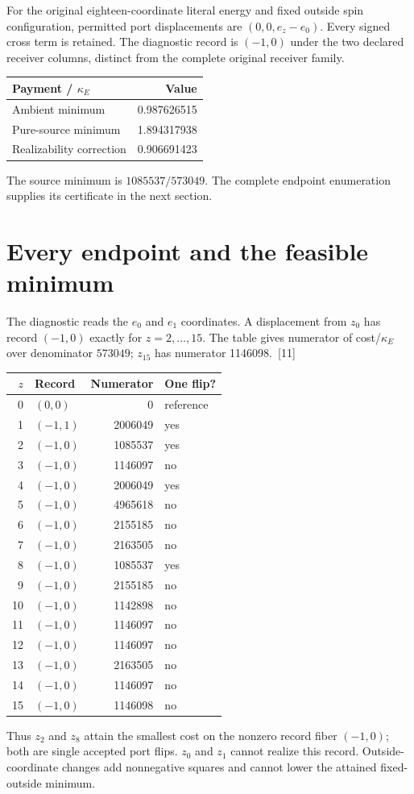\documentclass[10pt,twocolumn,letterpaper]{article}
\begin{document}
For the original eighteen-coordinate literal energy and fixed outside spin configuration, permitted port displacements are $(0,0,e_z-e_0)$. Every signed cross term is retained. The diagnostic record is $(-1,0)$ under the two declared receiver columns, distinct from the complete original receiver family.

\begin{center}
\begin{tabular}{@{}lr@{}}
\toprule
Payment / $\kappa_E$ & Value\\
\midrule
Ambient minimum & 0.987626515\\
Pure-source minimum & 1.894317938\\
Realizability correction & 0.906691423\\
\bottomrule
\end{tabular}
\end{center}
The source minimum is $1085537/573049$. The complete endpoint enumeration supplies its certificate in the next section.

\section{Every endpoint and the feasible minimum}
The diagnostic reads the $e_0$ and $e_1$ coordinates. A displacement from $z_0$ has record $(-1,0)$ exactly for $z=2,\ldots,15$. The table gives numerator of cost/$\kappa_E$ over denominator $573049$; $z_{15}$ has numerator 1146098.~[11]

\begin{center}
\begin{tabular}{@{}rlrl@{}}
\toprule
$z$ & Record & Numerator & One flip?\\
\midrule
0 & $(0,0)$ & 0 & reference\\
1 & $(-1,1)$ & 2006049 & yes\\
2 & $(-1,0)$ & 1085537 & yes\\
3 & $(-1,0)$ & 1146097 & no\\
4 & $(-1,0)$ & 2006049 & yes\\
5 & $(-1,0)$ & 4965618 & no\\
6 & $(-1,0)$ & 2155185 & no\\
7 & $(-1,0)$ & 2163505 & no\\
8 & $(-1,0)$ & 1085537 & yes\\
9 & $(-1,0)$ & 2155185 & no\\
10 & $(-1,0)$ & 1142898 & no\\
11 & $(-1,0)$ & 1146097 & no\\
12 & $(-1,0)$ & 1146097 & no\\
13 & $(-1,0)$ & 2163505 & no\\
14 & $(-1,0)$ & 1146097 & no\\
15 & $(-1,0)$ & 1146098 & no\\
\bottomrule
\end{tabular}
\end{center}
Thus $z_2$ and $z_8$ attain the smallest cost on the nonzero record fiber $(-1,0)$; both are single accepted port flips. $z_0$ and $z_1$ cannot realize this record. Outside-coordinate changes add nonnegative squares and cannot lower the attained fixed-outside minimum.
\end{document}
